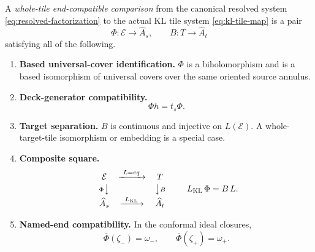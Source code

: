 \begin{definition}\label{def:whole-tile-comparison}
A \emph{whole-tile end-compatible comparison} from the canonical resolved system \eqref{eq:resolved-factorization} to the actual KL tile system \eqref{eq:kl-tile-map} is a pair
\begin{equation}\label{eq:comparison-pair}
\Phi\colon\mathcal E\longrightarrow\widehat A_s,
\qquad
B\colon T\longrightarrow\widehat A_t
\end{equation}
satisfying all of the following.
\begin{enumerate}
\item \textbf{Based universal-cover identification.}  \(\Phi\) is a biholomorphism and is a based isomorphism of universal covers over the same oriented source annulus.
\item \textbf{Deck-generator compatibility.}
\begin{equation}\label{eq:deck-generator-compat}
\Phi h=t_s\Phi.
\end{equation}
\item \textbf{Target separation.}  \(B\) is continuous and injective on \(L(\mathcal E)\).  A whole-target-tile isomorphism or embedding is a special case.
\item \textbf{Composite square.}
\begin{equation}\label{eq:comparison-square}
\begin{array}{ccc}
\mathcal E&\xrightarrow{\ L=e q\ }&T\\[2pt]
{\scriptstyle\Phi}\big\downarrow&&\big\downarrow{\scriptstyle B}\\[2pt]
\widehat A_s&\xrightarrow{\ L_{\mathrm{KL}}\ }&\widehat A_t
\end{array}
\qquad
L_{\mathrm{KL}}\,\Phi=B\,L.
\end{equation}
\item \textbf{Named-end compatibility.}  In the conformal ideal closures,
\begin{equation}\label{eq:named-end-compat}
\overline\Phi(\zeta_-)=\omega_-,
\qquad
\overline\Phi(\zeta_+)=\omega_+.
\end{equation}
\end{enumerate}
\end{definition}

